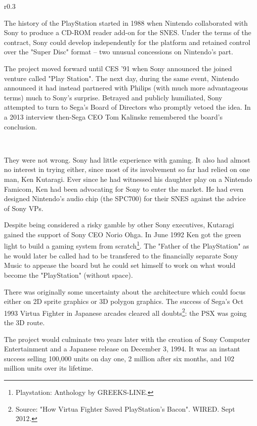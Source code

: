 \begin{wrapfigure}[11]{r}{0.3\textwidth}{
\centering {}}
\end{wrapfigure}
The history of the PlayStation started in 1988 when Nintendo collaborated with Sony to produce a CD-ROM reader add-on for the SNES. Under the terms of the contract, Sony could develop independently for the platform and retained control over the "Super Disc" format -- two unusual concessions on Nintendo's part.\\
\par
 The project moved forward until CES '91 when Sony announced the joined venture called "Play Station". The next day, during the same event, Nintendo announced it had instead partnered with Philips (with much more advantageous terms) much to Sony's surprise. Betrayed and publicly humiliated, Sony attempted to turn to Sega's Board of Directors who promptly vetoed the idea. In a 2013 interview then-Sega CEO Tom Kalinske remembered the board's conclusion.\\
\par
{}\\
\par
They were not wrong. Sony had little experience with gaming. It also had almost no interest in trying either, since most of its involvement so far had relied on one man, Ken Kutaragi. Ever since he had witnessed his daughter play on a Nintendo Famicom, Ken had been advocating for Sony to enter the market. He had even designed Nintendo's audio chip (the SPC700) for their SNES against the advice of Sony VPs.\\
\par
 Despite being considered a risky gamble by other Sony executives, Kutaragi gained the support of Sony CEO Norio Ohga. In June 1992 Ken got the green light to build a gaming system from scratch\footnote{Playstation: Anthology by GREEKS-LINE.}. The "Father of the PlayStation" as he would later be called had to be transfered to the financially separate Sony Music to appease the board but he could set himself to work on what would become the "PlayStation" (without space).\\
\par
There was originally some uncertainty about the architecture which could focus either on 2D sprite graphics or 3D polygon graphics. The success of Sega's Oct 1993 Virtua Fighter in Japanese arcades cleared all doubts\footnote{Source: "How Virtua Fighter Saved PlayStation's Bacon". WIRED. Sept 2012.}: the PSX was going the 3D route.\\
\par
The project would culminate two years later with the creation of Sony Computer Entertainment and a Japanese release on December 3, 1994. It was an instant success selling 100,000 units on day one, 2 million after six months, and 102 million units over its lifetime.\\
\par


